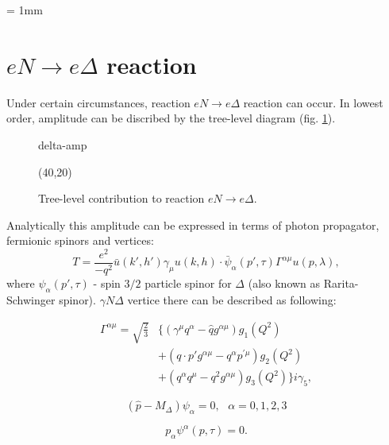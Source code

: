 \documentclass[12pt]{revtex4-1}
\begin{document}
	\unitlength = 1mm
\section{ $eN \to e\Delta$ reaction}
	Under certain circumstances, reaction $eN \to e\Delta$ reaction
	can occur. In lowest order, amplitude can be discribed by the
	tree-level diagram (fig. \ref{fig:delta-amp}).
	\begin{figure} \centering \label{fig:delta-amp}
	\begin{fmffile}{delta-amp}
		\begin{fmfgraph*}(40,20)
		\end{fmfgraph*}
	\end{fmffile}
	\caption{Tree-level contribution to reaction $eN \to e\Delta$.}
	\end{figure}
	
	Analytically this amplitude can be expressed in terms of photon propagator,
	fermionic spinors and vertices:
	\begin{equation}
		T = \frac{e^2}{-q^2} \bar{u}(k', h') \gamma_\mu u(k, h) \cdot
		\bar{\psi}_\alpha (p', \tau) \Gamma^{\alpha \mu} u(p, \lambda),
	\end{equation}
	where $\psi_\alpha (p', \tau)$ - spin $3/2$ particle spinor for $\Delta$
	(also known as Rarita-Schwinger spinor). $\gamma N \Delta$ vertice there
	can be described as following:
	
	\begin{align} \label{eqn:big-gamma}
	\Gamma^{\alpha \mu} = \sqrt{\frac{2}{3}}& \{ (\gamma^\mu 
	q^\alpha - \hat{q} g^{\alpha \mu})g_1(Q^2) 
	\\
	& + (q \cdot p' g^{\alpha \mu} - q^\alpha p^{\prime \mu}) g_2(Q^2)
	\\
	& + (q^\alpha q^\mu - q^2 g^{\alpha \mu}) g_3(Q^2)\} i \gamma_5,
	\end{align}

	\begin{equation}
		(\hat{p} - M_\Delta) \psi_\alpha = 0, \,\,\,\, \alpha = 0,1,2,3
	\end{equation}
	
	\begin{equation}
		p_\alpha \psi^\alpha(p, \tau) = 0.
	\end{equation}
\end{document}

